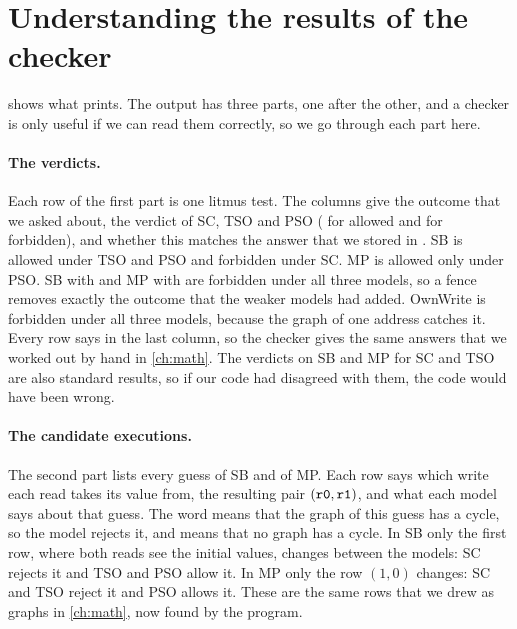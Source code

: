 \section{Understanding the results of the checker}
\label{sec:sanity}

 shows what  prints. The output has three parts, one after the other, and a checker is only useful if we can read them correctly, so we go through each part here.

\paragraph{The verdicts.} Each row of the first part is one litmus test. The columns give the outcome that we asked about, the verdict of SC, TSO and PSO ( for allowed and  for forbidden), and whether this matches the answer that we stored in . SB is allowed under TSO and PSO and forbidden under SC. MP is allowed only under PSO. SB with  and MP with  are forbidden under all three models, so a fence removes exactly the outcome that the weaker models had added. OwnWrite is forbidden under all three models, because the graph of one address catches it. Every row says  in the last column, so the checker gives the same answers that we worked out by hand in \cref{ch:math}. The verdicts on SB and MP for SC and TSO are also standard results\cite{owens2009}, so if our code had disagreed with them, the code would have been wrong.

\paragraph{The candidate executions.} The second part lists every guess of SB and of MP. Each row says which write each read takes its value from, the resulting pair $(\texttt{r0},\texttt{r1})$, and what each model says about that guess. The word  means that the graph of this guess has a cycle, so the model rejects it, and  means that no graph has a cycle. In SB only the first row, where both reads see the initial values, changes between the models: SC rejects it and TSO and PSO allow it. In MP only the row $(1, 0)$ changes: SC and TSO reject it and PSO allows it. These are the same rows that we drew as graphs in \cref{ch:math}, now found by the program.

